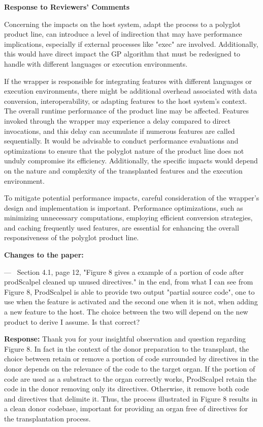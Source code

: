 \documentclass[a4paper,11pt]{letter}
\newcounter{reviewer}
\newcounter{point}[reviewer]
\renewcommand{\thepoint}{P\,\thereviewer.\arabic{point}}
\newenvironment{point}
   {\refstepcounter{point} \bigskip \noindent {\textbf{Reviewer~Point~\thepoint} } ---\ }
   {\par }
\newcommand{\response}[1]{\textbf{Response:} \begingroup\color{black}#1\endgroup}
\newcommand{\changes}[1]{\textbf{Changes to the paper:} \begingroup\color{blue}#1\endgroup}
\begin{document}
\begin{letter}{\textbf{Response to Reviewers' Comments}}
{Concerning the impacts on the host system, adapt the process to a polyglot product line, can introduce a level of indirection that may have performance implications, especially if external processes like "exec" are involved. Additionally, this would have direct impact the GP algorithm that must be redesigned to handle with different languages or execution environments. 

If the wrapper is responsible for integrating features with different languages or execution environments, there might be additional overhead associated with data conversion, interoperability, or adapting features to the host system's context. The overall runtime performance of the product line may be affected. Features invoked through the wrapper may experience a delay compared to direct invocations, and this delay can accumulate if numerous features are called sequentially. It would be advisable to conduct performance evaluations and optimizations to ensure that the polyglot nature of the product line does not unduly compromise its efficiency. Additionally, the specific impacts would depend on the nature and complexity of the transplanted features and the execution environment.

To mitigate potential performance impacts, careful consideration of the wrapper's design and implementation is important. Performance optimizations, such as minimizing unnecessary computations, employing efficient conversion strategies, and caching frequently used features, are essential for enhancing the overall responsiveness of the polyglot product line.}

\changes{}

\begin{point}
Section 4.1, page 12, "Figure 8 gives a example of a portion of code after prodScalpel cleaned up unused directives."
in the end, from what I can see from Figure 8, ProdScalpel is able to provide two output "partial source code", one to use when the feature is activated and the second one when it is not, when adding a new feature to the host. The choice between the two will depend on the new product to derive I assume. Is that correct?
	\label{pt:foo}
\end{point}

\response{Thank you for your insightful observation and question regarding Figure 8. In fact in the context of the donor preparation to the transplant, the choice between retain or remove a portion of code surrounded by directives in the donor depends on the relevance of the code to the target organ. If the portion of code are used as a substract to the organ correctly works, ProdScalpel retain the code in the donor removing only its directives. Otherwise, it remove both code and directives that delimite it. Thus, the process illustrated in Figure 8 results in a clean donor codebase, important for providing an organ free of directives for the transplantation process. 

}
\end{letter}
\end{document}
